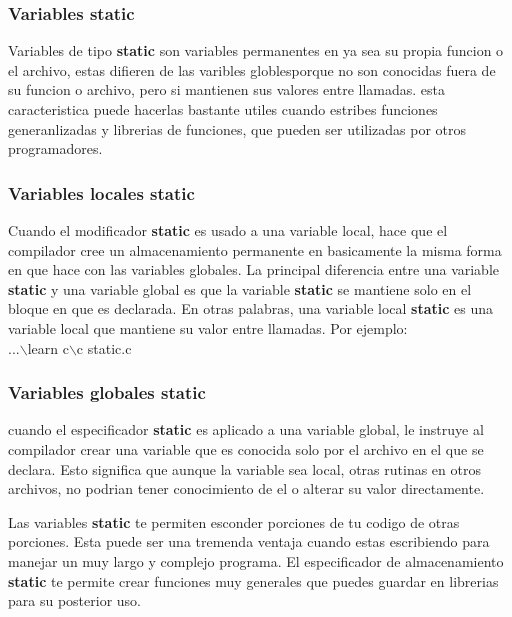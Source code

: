 \documentclass[]{article}
\begin{document}
	\subsubsection{Variables static}
	
	Variables de tipo \textbf{static} son variables permanentes en ya sea su propia funcion o el archivo, estas difieren de las varibles globlesporque no son conocidas fuera de su funcion o archivo, pero si mantienen sus valores entre llamadas. esta caracteristica puede hacerlas bastante utiles cuando estribes funciones generanlizadas y librerias de funciones, que pueden ser utilizadas por otros programadores.
	
	\subsubsection{Variables locales static}
	
	Cuando el modificador \textbf{static} es usado a una variable local, hace que el compilador cree un almacenamiento permanente en basicamente la misma forma en que hace con las variables globales. La principal diferencia entre una variable \textbf{static} y una variable global es que la variable \textbf{static} se mantiene solo en el bloque en que es declarada. En otras palabras, una variable local  \textbf{static} es una variable local que mantiene su valor entre llamadas. Por ejemplo:\\
	
	...$\backslash$learn c$\backslash$c static.c\\
	
	\subsubsection{Variables globales static}
	
	cuando el especificador \textbf{static} es aplicado a una variable global, le instruye al compilador crear una variable que es conocida solo por el archivo en el que se declara. Esto significa que aunque la variable sea local, otras rutinas en otros archivos, no podrian tener conocimiento de el o alterar su valor directamente.
	
	Las variables \textbf{static} te permiten esconder porciones de tu codigo de otras porciones. Esta puede ser una tremenda ventaja cuando estas escribiendo para manejar un muy largo y complejo programa. El especificador de almacenamiento \textbf{static} te permite crear funciones muy generales que puedes guardar en librerias para su posterior uso.
	
\end{document}
